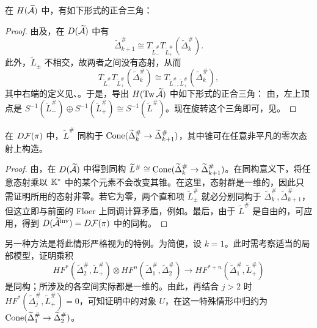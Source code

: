 \begin{lemma}\label{st:18.20}
在 $H(\widetilde{\mathcal A})$ 中，有如下形式的正合三角：
\end{lemma}
\begin{proof}
由及，在 $D(\widetilde{\mathcal A})$ 中有
\begin{equation}\label{eq:18.27}
\widetilde\Delta_{k+1}^\#\cong T_{\widetilde L_-^\#}T_{\widetilde L_+^\#}(\widetilde\Delta_k^\#).
\end{equation}
此外，$\widetilde L_\pm$ 不相交，故两者之间没有态射，从而
\[
T_{\widetilde L_-^\#}T_{\widetilde L_+^\#}(\widetilde\Delta_k^\#)
\cong T_{\widetilde L_-^\#,\widetilde L_+^\#}(\widetilde\Delta_k^\#),
\]
其中右端的定义见、。于是，导出 $H(\operatorname{Tw}\widetilde{\mathcal A})$ 中如下形式的正合三角：
由，左上顶点是 $S^{-1}(\widetilde L_-^\#)\oplus S^{-1}(\widetilde L_+^\#)\cong S^{-1}(\widetilde L^\#)$。现在旋转这个三角即可，见。
\end{proof}

\begin{proposition}\label{st:18.21}
在 $D\mathcal F(\pi)$ 中，$\widetilde L^\#$ 同构于 $\operatorname{Cone}(\widetilde\Delta_k^\#\to\widetilde\Delta_{k+1}^\#)$，其中锥可在任意非平凡的零次态射上构造。
\end{proposition}
\begin{proof}
由，在 $D(\widetilde{\mathcal A})$ 中得到同构 $\widetilde L^\#\cong\operatorname{Cone}(\widetilde\Delta_k^\#\to\widetilde\Delta_{k+1}^\#)$。在同构意义下，将任意态射乘以 $\mathbb K^*$ 中的某个元素不会改变其锥。在这里，态射群是一维的，因此只需证明所用的态射非零。若它为零，两个直和项 $\widetilde L_\pm^\#$ 就必分别同构于 $\widetilde\Delta_k^\#,\widetilde\Delta_{k+1}^\#$，但这立即与前面的 Floer 上同调计算矛盾，例如。最后，由于 $\widetilde L^\#$ 是自由的，可应用，得到 $D(\widetilde{\mathcal A}^{\mathrm{inv}})=D\mathcal F(\pi)$ 中的同构。
\end{proof}

\begin{note}\label{st:18.22}
另一种方法是将此情形严格视为的特例。为简便，设 $k=1$。此时需考察适当的局部模型，证明乘积
\[
HF^*(\widetilde\Delta_2^\#,\widetilde L_+^\#)\otimes HF^n(\widetilde\Delta_1^\#,\widetilde\Delta_2^\#)
\longrightarrow HF^{*+n}(\widetilde\Delta_1^\#,\widetilde L_+^\#)
\]
是同构；所涉及的各空间实际都是一维的。由此，再结合 $j>2$ 时 $HF^*(\widetilde\Delta_j^\#,\widetilde L_+^\#)=0$，可知证明中的对象 $U$，在这一特殊情形中归约为 $\operatorname{Cone}(\widetilde\Delta_1^\#\to\widetilde\Delta_2^\#)$。
\end{note}
